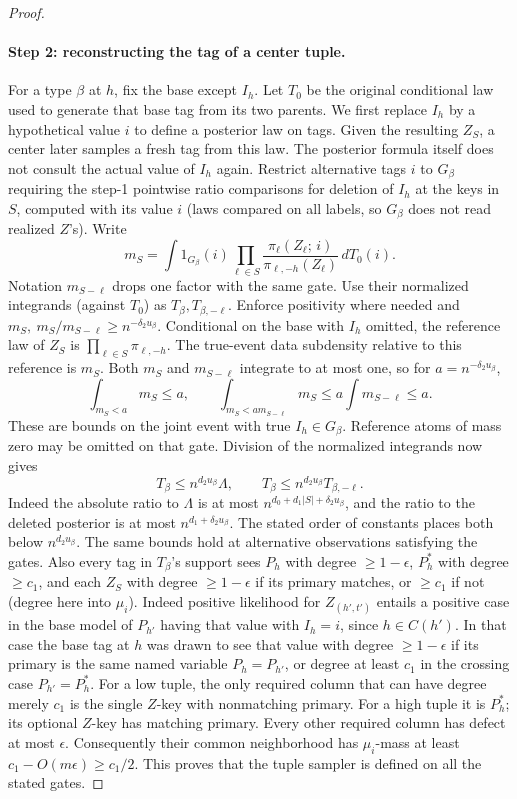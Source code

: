 \begin{proof}
\paragraph{Step 2: reconstructing the tag of a center tuple.} For a type \(\beta\) at \(h\), fix the base except \(I_h\).
Let \(T_0\) be the original conditional law used to generate that base
tag from its two parents. We first replace \(I_h\) by a hypothetical
value \(i\) to define a posterior law on tags. Given the resulting
\(Z_S\), a center later samples a fresh tag from this law. The posterior
formula itself does not consult the actual value of \(I_h\) again. Restrict alternative tags \(i\) to \(G_\beta\) requiring the step-1 pointwise ratio comparisons for deletion of \(I_h\) at the keys in \(S\), computed with its value \(i\) (laws compared on all labels, so \(G_\beta\) does not read realized \(Z\)'s). Write
\[
 m_S=\int 1_{G_\beta}(i)\prod_{\ell\in S}
 \frac{\pi_\ell(Z_\ell;\,i)}{\pi_{\ell,-h}(Z_\ell)}\,dT_0(i).
\]
Notation \(m_{S-\ell}\) drops one factor with the same gate. Use their normalized integrands (against \(T_0\)) as \(T_\beta,T_{\beta,-\ell}\). Enforce positivity where needed and \(m_S,\ m_S/m_{S-\ell}\ge n^{-\delta_2 u_\beta}\). Conditional on the base with \(I_h\) omitted, the reference law of
\(Z_S\) is \(\prod_{\ell\in S}\pi_{\ell,-h}\).
The true-event data subdensity relative to this reference is \(m_S\).
Both \(m_S\) and \(m_{S-\ell}\) integrate to at most one, so for
\(a=n^{-\delta_2u_\beta}\),
\[
 \int_{m_S<a}m_S\le a,
 \qquad
 \int_{m_S<a m_{S-\ell}}m_S\le a\int m_{S-\ell}\le a.
\]
These are bounds on the joint event with true \(I_h\in G_\beta\).
Reference atoms of mass zero may be omitted on that gate. Division of the
normalized integrands now gives
\[
 T_\beta\le n^{d_2 u_\beta}\Lambda,\qquad T_\beta\le n^{d_2 u_\beta}T_{\beta,-\ell}.
\]
Indeed the absolute ratio to \(\Lambda\) is at most
\(n^{d_0+d_1|S|+\delta_2u_\beta}\), and the ratio to the deleted
posterior is at most \(n^{d_1+\delta_2u_\beta}\). The stated order of
constants places both below \(n^{d_2u_\beta}\). The same bounds hold at alternative observations satisfying the gates. Also every tag in \(T_\beta\)'s support sees \(P_h\) with degree \(\ge1-\epsilon\), \(P_h^*\) with degree \(\ge c_1\), and each \(Z_S\) with degree \(\ge1-\epsilon\) if its primary matches, or \(\ge c_1\) if not (degree here into \(\mu_i\)). Indeed positive likelihood for \(Z_{(h',t')}\) entails a positive case in the base model of \(P_{h'}\) having that value with \(I_h=i\), since \(h\in C(h')\). In that case the base tag at \(h\) was drawn to see that value with degree \(\ge1-\epsilon\) if its primary is the same named variable \(P_h=P_{h'}\), or degree at least \(c_1\) in the crossing case \(P_{h'}=P_h^*\). For a low tuple, the only required column that can have degree merely
\(c_1\) is the single \(Z\)-key with nonmatching primary. For a high
tuple it is \(P_h^*\); its optional \(Z\)-key has matching primary.
Every other required column has defect at most \(\epsilon\).
Consequently their common neighborhood has \(\mu_i\)-mass at least
\(c_1-O(m\epsilon)\ge c_1/2\). This proves that the tuple sampler is
defined on all the stated gates.


\end{proof}
